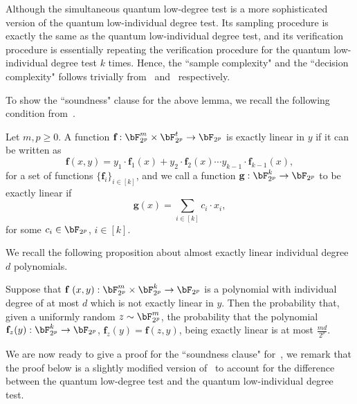 Although the simultaneous quantum low-degree test is a more sophisticated version of the quantum low-individual degree test. Its sampling procedure is exactly the same as the quantum low-individual degree test, and its verification procedure is essentially repeating the verification procedure for the quantum low-individual degree test $k$ times. Hence, the ``sample complexity" and the ``decision complexity" follows trivially from~ and~ respectively. 

To show the ``soundness" clause for the above lemma, we recall the following condition from~\cite{natarajanNEEXPMIP2019a}.
\begin{definition}
	Let $m, p \geq 0$. A function $\textbf{f}: \bF_{2^p}^m \times \bF_{2^p}^t \rightarrow \bF_{2^p}$ is exactly linear in $y$ if it can be written as 
	\begin{equation*}
		 \textbf{f}(x,y) = y_1 \cdot \textbf{f}_1(x)   +  y_2 \cdot \textbf{f}_2(x)   \cdots y_{k-1} \cdot \textbf{f}_{k-1}(x), 
	\end{equation*} 
	for a set of functions $\{ \textbf{f}_i \}_{i \in [k]}$, and we call a function $\textbf{g}: \bF_{2^p}^k \rightarrow \bF_{2^p}$ to be exactly linear if 
	\begin{equation*}
		\textbf{g}(x) = \sum_{i \in [k]} c_i \cdot x_i, 
	\end{equation*} 
	for some $c_i \in \bF_{2^p}$, $i \in [k]$. 
\end{definition}
We recall the following proposition about almost exactly linear individual degree $d$ polynomials.  
\begin{proposition} \label{prop:almostexactlinear}
	Suppose that $\textbf{f }(x,y):  \bF_{2^p}^m \times \bF_{2^p}^k \rightarrow \bF_{2^p}$ is a polynomial with individual degree of at most $d$ which is not exactly linear in $y$. Then the probability that, given a uniformly random $z \sim \bF_{2^p}^m$, the probability that the polynomial $\textbf{f}_{z}(y): \bF_{2^p}^k \rightarrow \bF_{2^p}$, $\textbf{f}_{z}(y) = \textbf{f}(z,y)$, being exactly linear is at most $ \frac{md}{2^p}$. 
\end{proposition}
We are now ready to give a proof for the ``soundness clause" for~, we remark that the proof below is a slightly modified version of~\cite[Theorem 4.43]{natarajanNEEXPMIP2019a} to account for the difference between the quantum low-degree test and the quantum low-individual degree test. 
